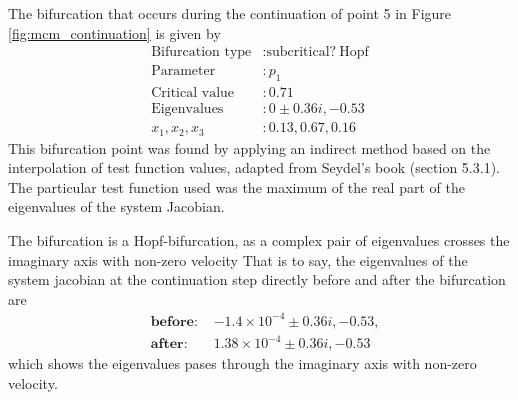 The bifurcation that occurs during the continuation of point 5 in Figure \ref{fig:mcm_continuation} is given by
\begin{align*}
    \text{Bifurcation type} & : \text{subcritical?} \ \text{Hopf} \\
    \text{Parameter} & : p_1 \\
    \text{Critical value} & : 0.71 \\
    \text{Eigenvalues} & : 0 \pm 0.36i, -0.53\\
    x_1, x_2, x_3 & : 0.13, 0.67, 0.16
\end{align*}
This bifurcation point was found by applying an indirect method based on the interpolation of test function values, adapted from 
Seydel's book (section 5.3.1). The particular test function used was the maximum of the real part of the eigenvalues of
the system Jacobian.

The bifurcation is a Hopf-bifurcation, as a complex pair of eigenvalues crosses the imaginary axis with non-zero velocity
That is to say, the eigenvalues of the system jacobian at the continuation step directly before and after the bifurcation are
\begin{align*}
    &\textbf{before: } &-1.4\times10^{-4} \pm 0.36i, -0.53,\\
    &\textbf{after: }  &1.38\times10^{-4} \pm 0.36i, -0.53	
\end{align*}
which shows the eigenvalues pases through the imaginary axis with non-zero velocity.

